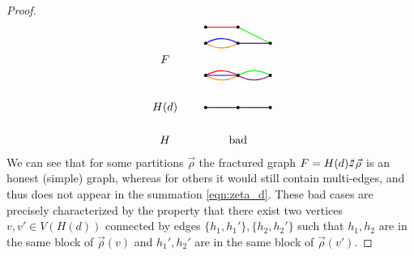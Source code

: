 \documentclass[authorcolumns,numberwithinsect]{no-lipics-v2022}
\def\fracture#1#2{\ensuremath{#1\raisebox{.2ex}{\rotatebox[origin=c]{-15}{$\sharp$}}#2}}
\def\fracture#1#2{\ensuremath{#1\raisebox{.2ex}{\rotatebox[origin=c]{-15}{$\sharp$}}#2}}
\begin{document}
\begin{proof}
\[\begin{tikzpicture}[thick]
    \draw (-1,1.5) node {$F$};
    \draw (-1,0) node {$H(d)$};
    \draw (-1,-1) node {$H$};
\end{tikzpicture}
\quad \quad
\begin{tikzpicture}[thick]
\begin{scope}[yshift=1cm]
    \draw[blue] (0,0) to[bend left] (1,0);
    \draw[red] (0,0.5) to (1,0.5);
    \draw[orange] (0,0) to[bend right] (1,0);
    \draw[green] (1,0.5) to (2,0);
    \draw[violet] (1,0) to (2,0);
    
    \draw[fill] (0,0) circle (1pt);
    \draw[fill] (0,0.5) circle (1pt);
    \draw[fill] (1,0) circle (1pt);
    \draw[fill] (1,0.5) circle (1pt);
    \draw[fill] (2,0) circle (1pt);
\end{scope}
    
    \draw[blue] (0,0) -- (1,0);
    \draw[red] (0,0) to[bend left] (1,0);
    \draw[orange] (0,0) to[bend right] (1,0);
    \draw[green] (1,0) to[bend left] (2,0);
    \draw[violet] (1,0) to[bend right] (2,0);
    
    \draw[fill] (0,0) circle (1pt);
    \draw[fill] (1,0) circle (1pt);
    \draw[fill] (2,0) circle (1pt);
\begin{scope}[yshift=-1cm]
    \draw[fill] (0,0) circle (1pt);
    \draw[fill] (1,0) circle (1pt);
    \draw[fill] (2,0) circle (1pt);

    \draw (0,0) -- (1,0) -- (2,0);
\end{scope}
        
        \draw (1,-2) node {\text{bad}};
\end{tikzpicture}
\]
We can see that for some partitions $\vec\rho$ the fractured graph $F=\fracture{H(d)}{\vec\rho}$ is an honest (simple) graph, whereas for others it would still contain multi-edges, and thus does not appear in the summation \eqref{eqn:zeta_d}. These bad cases are precisely characterized by the property that there exist two vertices $v, v' \in V(H(d))$ connected by edges $\{h_1, h_1'\}, \{h_2, h_2'\}$ such that $h_1, h_2$ are in the same block of $\vec\rho(v)$ and $h_1', h_2'$ are in the same block of $\vec\rho(v')$. 


\end{proof}
\end{document}
